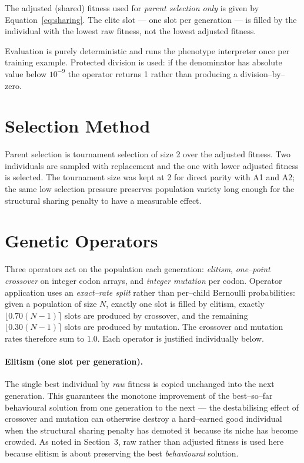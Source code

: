 \documentclass[12pt,a4paper]{article}
\begin{document}
The adjusted (shared) fitness used for \emph{parent selection only} is
given by Equation~\ref{eq:sharing}. The elite slot --- one slot per
generation --- is filled by the individual with the lowest raw fitness,
not the lowest adjusted fitness.

Evaluation is purely deterministic and runs the phenotype interpreter
once per training example. Protected division is used: if the
denominator has absolute value below $10^{-9}$ the operator returns 1
rather than producing a division--by--zero.

\section{Selection Method}

Parent selection is tournament selection of size 2 over the adjusted
fitness. Two individuals are sampled with replacement and the one with
lower adjusted fitness is selected. The tournament size was kept at 2
for direct parity with A1 and A2; the same low selection pressure
preserves population variety long enough for the structural sharing
penalty to have a measurable effect.

\section{Genetic Operators}

Three operators act on the population each generation: \emph{elitism},
\emph{one--point crossover} on integer codon arrays, and
\emph{integer mutation} per codon. Operator application uses an
\emph{exact--rate split} rather than per--child Bernoulli probabilities:
given a population of size $N$, exactly one slot is filled by elitism,
exactly $\lfloor 0.70(N-1)\rceil$ slots are produced by crossover, and the
remaining $\lfloor 0.30(N-1)\rceil$ slots are produced by mutation. The
crossover and mutation rates therefore sum to $1.0$. Each operator is
justified individually below.

\paragraph{Elitism (one slot per generation).} The single best
individual by \emph{raw} fitness is copied unchanged into the next
generation. This guarantees the monotone improvement of the
best--so--far behavioural solution from one generation to the next ---
the destabilising effect of crossover and mutation can otherwise
destroy a hard--earned good individual when the structural sharing
penalty has demoted it because its niche has become crowded. As noted
in Section~3, raw rather than adjusted fitness is used here because
elitism is about preserving the best \emph{behavioural} solution.
\end{document}
